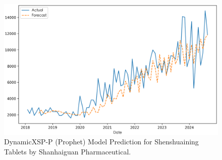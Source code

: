 \documentclass[journal]{IEEEtran}
\begin{document}
\begin{itemize}
\begin{figure}[H]
\includegraphics[width=\linewidth]{../Result_Paper/Prophet_Prediction_肾衰宁片_山海关药业.png}
\caption{DynamicXSP-P (Prophet) Model Prediction for Shenshuaining Tablets by Shanhaiguan Pharmaceutical.}
\label{fig:shenshuaining}
\end{figure}
\end{itemize}
\end{document}

